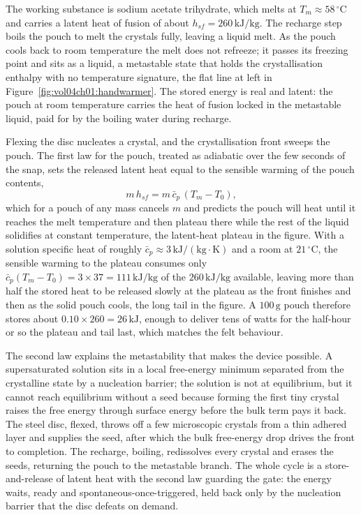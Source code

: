 The working substance is sodium acetate trihydrate, which melts at
$T_m \approx 58\,^{\circ}\mathrm{C}$ and carries a latent heat of fusion of
about $h_{sf} = 260\,\text{kJ}/\text{kg}$. The recharge step boils the pouch
to melt the crystals fully, leaving a liquid melt. As the pouch cools back to
room temperature the melt does not refreeze; it passes its freezing point and
sits as a  liquid, a metastable state that holds the
crystallisation enthalpy with no temperature signature, the flat line at left
in Figure~\ref{fig:vol04ch01:handwarmer}. The stored energy is real and
latent: the pouch at room temperature carries the heat of fusion locked in
the metastable liquid, paid for by the boiling water during recharge.



Flexing the disc nucleates a crystal, and the crystallisation front sweeps the
pouch. The first law for the pouch, treated as adiabatic over the few seconds
of the snap, sets the released latent heat equal to the sensible warming of
the pouch contents,
\[
m\,h_{sf} = m\,\bar c_p\,(T_m - T_0),
\]
which for a pouch of any mass cancels $m$ and predicts the pouch will heat
until it reaches the melt temperature and then plateau there while the rest of
the liquid solidifies at constant temperature, the latent-heat plateau in the
figure. With a solution specific heat of roughly $\bar c_p \approx 3\,\text{kJ}
/(\text{kg}\cdot\si{\kelvin})$ and a room at $21\,^{\circ}\mathrm{C}$, the
sensible warming to the plateau consumes only $\bar c_p (T_m - T_0) = 3 \times
37 = 111\,\text{kJ}/\text{kg}$ of the $260\,\text{kJ}/\text{kg}$ available,
leaving more than half the stored heat to be released slowly at the plateau as
the front finishes and then as the solid pouch cools, the long tail in the
figure. A $100\,\text{g}$ pouch therefore stores about
$0.10 \times 260 = 26\,\text{kJ}$, enough to deliver tens of watts for the
half-hour or so the plateau and tail last, which matches the felt behaviour.

The second law explains the metastability that makes the device possible.
A supersaturated solution sits in a local free-energy minimum separated from
the crystalline state by a nucleation barrier; the solution is not at
equilibrium, but it cannot reach equilibrium without a seed because forming
the first tiny crystal raises the free energy through surface energy before
the bulk term pays it back. The steel disc, flexed, throws off a few
microscopic crystals from a thin adhered layer and supplies the seed, after
which the bulk free-energy drop drives the front to completion. The recharge,
boiling, redissolves every crystal and erases the seeds, returning the pouch
to the metastable branch. The whole cycle is a store-and-release of latent
heat with the second law guarding the gate: the energy waits, ready and
spontaneous-once-triggered, held back only by the nucleation barrier that the
disc defeats on demand.

